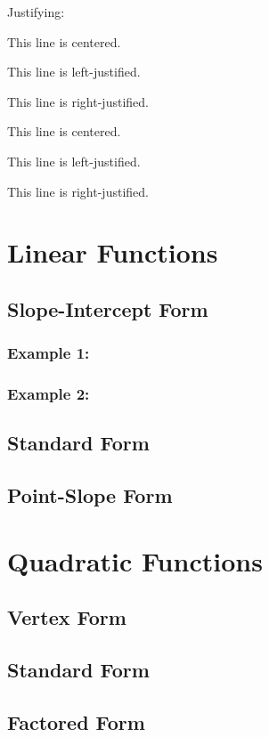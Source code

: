 \documentclass[11pt]{article}
\begin{document}
\pagebreak

Justifying:


\begin{center}This line is centered.\end{center}

\begin{flushleft}This line is left-justified.\end{flushleft}

\begin{flushright}This line is right-justified.\end{flushright}

\vspace{1cm}

This line is centered.

This line is left-justified.

This line is right-justified.


\section{Linear Functions}
	\subsection{Slope-Intercept Form}
		\subsubsection{Example 1:}
		\subsubsection{Example 2:}
	\subsection{Standard Form}
	\subsection{Point-Slope Form}
\section{Quadratic Functions}
	\subsection{Vertex Form}
	\subsection{Standard Form}
	\subsection{Factored Form}
\end{document}
